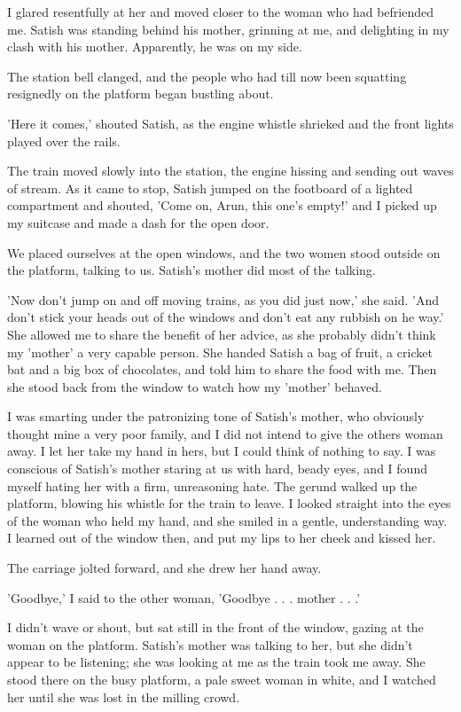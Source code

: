 \par
I glared resentfully at her and moved closer to the woman who had befriended me. Satish was standing behind his mother, grinning at me, and delighting in my clash with his mother. Apparently, he was on my side.
\par
The station bell clanged, and the people who had till now been squatting resignedly on the platform began bustling about.
\par
'Here it comes,' shouted Satish, as the engine whistle shrieked and the front lights played over the rails.
\par
The train moved slowly into the station, the engine hissing and sending out waves of stream. As it came to stop, Satish jumped on the footboard of a lighted compartment and shouted, 'Come on, Arun, this one's empty!' and I picked up my suitcase and made a dash for the open door. 
\par
We placed ourselves at the open windows, and the two women stood outside on the platform, talking to us. Satish's mother did most of the talking.
\par
'Now don't jump on and off moving trains, as you did just now,' she said. 'And don't stick your heads out of the windows and don't eat any rubbish on he way.' She allowed me to share the benefit of her advice, as she probably didn't think my 'mother' a very capable person. She handed Satish a bag of fruit, a cricket bat and a big box of chocolates, and told him to share the food with me. Then she stood back from the window to watch how my 'mother' behaved.
\par
I was smarting under the patronizing tone of Satish's mother, who obviously thought mine a very poor family, and I did not intend to give the others woman away. I let her take my hand in hers, but I could think of nothing to say. I was conscious of Satish's mother staring at us with hard, beady eyes, and I found myself hating her with a firm, unreasoning hate. The gerund walked up the platform, blowing his whistle for the train to leave. I looked straight into the eyes of the woman who held my hand, and she smiled in a gentle, understanding way. I learned out of the window then, and put my lips to her cheek and kissed her.
\par
The carriage jolted forward, and she drew her hand away.
\par
'Goodbye,' I said to the other woman, 'Goodbye . . . mother . . .'
\par
I didn't wave or shout, but sat still in the front of the window, gazing at the woman on the platform. Satish's mother was talking to her, but she didn't appear to be listening; she was looking at me as the train took me away. She stood there on the busy platform, a pale sweet woman in white, and I watched her until she was lost in the milling crowd.
